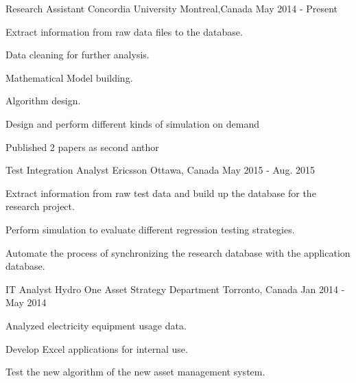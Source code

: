 \documentclass[11pt, a4paper]{awesome-cv} %
\begin{document}
\begin{cventries}
	
	
	\cventry
	{Research Assistant} %
	{Concordia University} %
	{Montreal,Canada} %
	{May 2014 - Present} %
	{ %
		\begin{cvitems}
			\item {Extract information from raw data files to the database.}
			\item {Data cleaning for further analysis.}
			\item {Mathematical Model building.}
			\item {Algorithm design.}
			\item {Design and perform different kinds of simulation on demand}
			\item {Published 2 papers as second anthor}
		\end{cvitems}
	}
	
	


	
	
	\cventry
	{Test Integration Analyst} %
	{Ericsson} %
	{Ottawa, Canada} %
	{May 2015 - Aug. 2015} %
	{ %
		\begin{cvitems}
			\item {Extract information from raw test data and build up the database for the research project.}
			\item {Perform simulation to evaluate different regression testing strategies.}
			\item {Automate the process of synchronizing the research database with the application database.}
		\end{cvitems}
	}
	
	
	
	


	
	
	\cventry
	{IT Analyst} %
	{Hydro One Asset Strategy Department} %
	{Torronto, Canada} %
	{Jan 2014 - May 2014} %
	{ %
		\begin{cvitems}
			\item {Analyzed electricity equipment usage data.}
			\item {Develop Excel applications for internal use.}
			\item {Test the new algorithm of the new asset management system.}
		\end{cvitems}
	}
	

\end{cventries}
\end{document}
